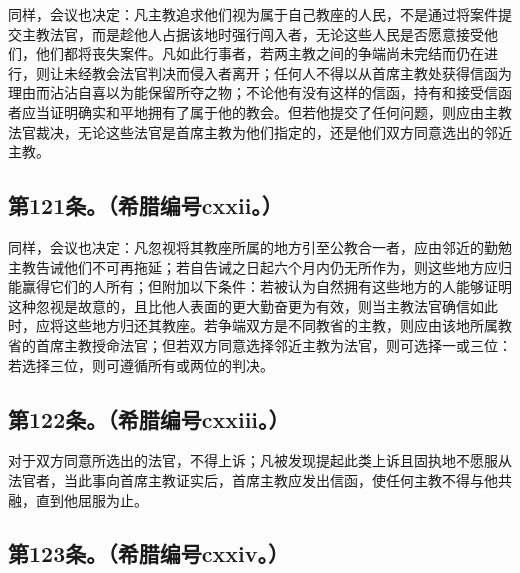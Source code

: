 同样，会议也决定：凡主教追求他们视为属于自己教座的人民，不是通过将案件提交主教法官，而是趁他人占据该地时强行闯入者，无论这些人民是否愿意接受他们，他们都将丧失案件。凡如此行事者，若两主教之间的争端尚未完结而仍在进行，则让未经教会法官判决而侵入者离开；任何人不得以从首席主教处获得信函为理由而沾沾自喜以为能保留所夺之物；不论他有没有这样的信函，持有和接受信函者应当证明确实和平地拥有了属于他的教会。但若他提交了任何问题，则应由主教法官裁决，无论这些法官是首席主教为他们指定的，还是他们双方同意选出的邻近主教。\par


\subsection{第121条。（希腊编号cxxii。）}

\par

同样，会议也决定：凡忽视将其教座所属的地方引至公教合一者，应由邻近的勤勉主教告诫他们不可再拖延；若自告诫之日起六个月内仍无所作为，则这些地方应归能赢得它们的人所有；但附加以下条件：若被认为自然拥有这些地方的人能够证明这种忽视是故意的，且比他人表面的更大勤奋更为有效，则当主教法官确信如此时，应将这些地方归还其教座。若争端双方是不同教省的主教，则应由该地所属教省的首席主教授命法官；但若双方同意选择邻近主教为法官，则可选择一或三位：若选择三位，则可遵循所有或两位的判决。\par


\subsection{第122条。（希腊编号cxxiii。）}

\par

对于双方同意所选出的法官，不得上诉；凡被发现提起此类上诉且固执地不愿服从法官者，当此事向首席主教证实后，首席主教应发出信函，使任何主教不得与他共融，直到他屈服为止。\par


\subsection{第123条。（希腊编号cxxiv。）}


